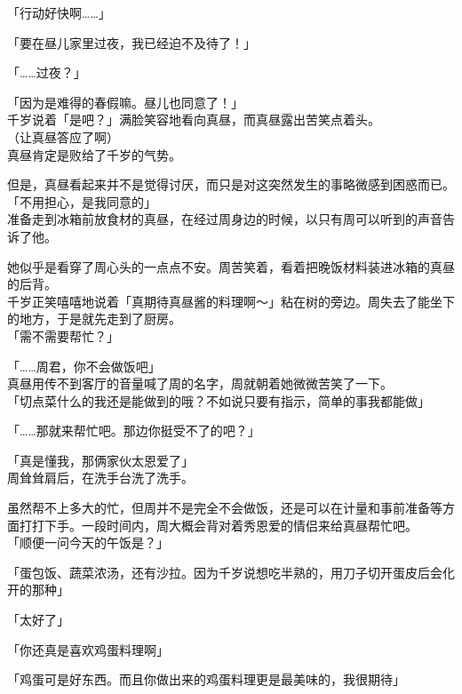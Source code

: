 「行动好快啊……」

「要在昼儿家里过夜，我已经迫不及待了！」

「……过夜？」

「因为是难得的春假嘛。昼儿也同意了！」\\

千岁说着「是吧？」满脸笑容地看向真昼，而真昼露出苦笑点着头。\\

（让真昼答应了啊）\\

真昼肯定是败给了千岁的气势。

但是，真昼看起来并不是觉得讨厌，而只是对这突然发生的事略微感到困惑而已。\\

「不用担心，是我同意的」\\

准备走到冰箱前放食材的真昼，在经过周身边的时候，以只有周可以听到的声音告诉了他。

她似乎是看穿了周心头的一点点不安。周苦笑着，看着把晚饭材料装进冰箱的真昼的后背。\\

千岁正笑嘻嘻地说着「真期待真昼酱的料理啊～」粘在树的旁边。周失去了能坐下的地方，于是就先走到了厨房。\\

「需不需要帮忙？」

「……周君，你不会做饭吧」\\

真昼用传不到客厅的音量喊了周的名字，周就朝着她微微苦笑了一下。\\

「切点菜什么的我还是能做到的哦？不如说只要有指示，简单的事我都能做」

「……那就来帮忙吧。那边你挺受不了的吧？」

「真是懂我，那俩家伙太恩爱了」\\

周耸耸肩后，在洗手台洗了洗手。

虽然帮不上多大的忙，但周并不是完全不会做饭，还是可以在计量和事前准备等方面打打下手。一段时间内，周大概会背对着秀恩爱的情侣来给真昼帮忙吧。\\

「顺便一问今天的午饭是？」

「蛋包饭、蔬菜浓汤，还有沙拉。因为千岁说想吃半熟的，用刀子切开蛋皮后会化开的那种」

「太好了」

「你还真是喜欢鸡蛋料理啊」

「鸡蛋可是好东西。而且你做出来的鸡蛋料理更是最美味的，我很期待」\\

